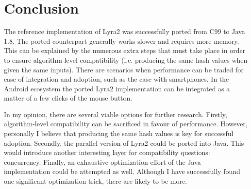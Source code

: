 \chapter{Conclusion}
\label{sec:conclusion}

The reference implementation of Lyra2 was successfully ported from C99 to Java 1.8. The ported counterpart generally works slower and requires more memory. This can be explained by the numerous extra steps that must take place in order to ensure algorithm-level compatibility (i.e. producing the same hash values when given the same inputs). There are scenarios when performance can be traded for ease of integration and adoption, such as the case with smartphones. In the Android ecosystem the ported Lyra2 implementation can be integrated as a matter of a few clicks of the mouse button.

In my opinion, there are several viable options for further research. Firstly, algorithm-level compatibility can be sacrificed in favour of performance. However, personally I believe that producing the same hash values is key for successful adoption. Secondly, the parallel version of Lyra2 could be ported into Java. This would introduce another interesting layer for compatibility questions: concurrency. Finally, an exhaustive optimization effort of the Java implementation could be attempted as well. Although I have successfully found one significant optimization trick, there are likely to be more.
